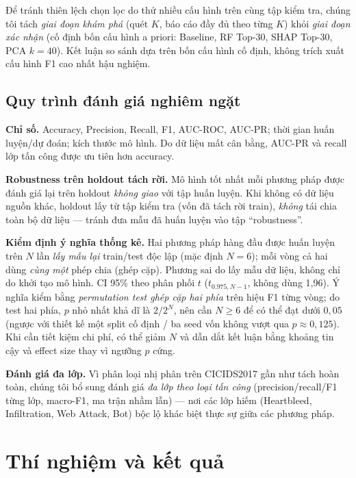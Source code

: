 \documentclass[runningheads]{llncs}
\begin{document}
Để tránh thiên lệch chọn lọc do thử nhiều cấu hình trên cùng tập kiểm tra, chúng tôi tách \emph{giai đoạn khám phá} (quét $K$, báo cáo đầy đủ theo từng $K$) khỏi \emph{giai đoạn xác nhận} (cố định bốn cấu hình a priori: Baseline, RF Top-30, SHAP Top-30, PCA $k{=}40$). Kết luận so sánh dựa trên bốn cấu hình cố định, không trích xuất cấu hình F1 cao nhất hậu nghiệm.

\subsection{Quy trình đánh giá nghiêm ngặt}
\label{sec:eval}

\textbf{Chỉ số.} Accuracy, Precision, Recall, F1, AUC-ROC, AUC-PR; thời gian huấn luyện/dự đoán; kích thước mô hình. Do dữ liệu mất cân bằng, AUC-PR và recall lớp tấn công được ưu tiên hơn accuracy.

\textbf{Robustness trên holdout tách rời.} Mô hình tốt nhất mỗi phương pháp được đánh giá lại trên holdout \emph{không giao} với tập huấn luyện. Khi không có dữ liệu nguồn khác, holdout lấy từ tập kiểm tra (vốn đã tách rời train), \emph{không} tái chia toàn bộ dữ liệu --- tránh đưa mẫu đã huấn luyện vào tập ``robustness''.

\textbf{Kiểm định ý nghĩa thống kê.} Hai phương pháp hàng đầu được huấn luyện trên $N$ lần \emph{lấy mẫu lại} train/test độc lập (mặc định $N{=}6$); mỗi vòng cả hai dùng \emph{cùng một} phép chia (ghép cặp). Phương sai do lấy mẫu dữ liệu, không chỉ do khởi tạo mô hình. CI 95\% theo phân phối $t$ ($t_{0.975,N-1}$, không dùng 1{,}96). Ý nghĩa kiểm bằng \emph{permutation test ghép cặp hai phía} trên hiệu F1 từng vòng; do test hai phía, $p$ nhỏ nhất khả dĩ là $2/2^N$, nên cần $N \geq 6$ để có thể đạt dưới $0{,}05$ (ngược với thiết kế một split cố định / ba seed vốn không vượt qua $p \approx 0{,}125$). Khi cần tiết kiệm chi phí, có thể giảm $N$ và dẫn dắt kết luận bằng khoảng tin cậy và effect size thay vì ngưỡng $p$ cứng.

\textbf{Đánh giá đa lớp.} Vì phân loại nhị phân trên CICIDS2017 gần như tách hoàn toàn, chúng tôi bổ sung đánh giá \emph{đa lớp theo loại tấn công} (precision/recall/F1 từng lớp, macro-F1, ma trận nhầm lẫn) --- nơi các lớp hiếm (Heartbleed, Infiltration, Web Attack, Bot) bộc lộ khác biệt thực sự giữa các phương pháp.

\section{Thí nghiệm và kết quả}
\label{sec:exp}
\end{document}
